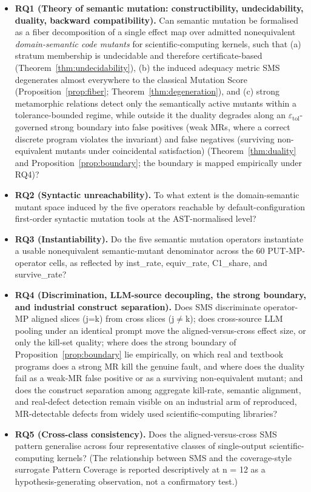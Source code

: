 \documentclass[manuscript,screen,review]{acmart}
\begin{document}
\begin{itemize}

\item
  \textbf{RQ1 (Theory of semantic mutation: constructibility,
  undecidability, duality, backward compatibility).} Can semantic
  mutation be formalised as a fiber decomposition of a single effect map
  over admitted nonequivalent \emph{domain-semantic code mutants} for
  scientific-computing kernels, such that (a) stratum membership is
  undecidable and therefore certificate-based (Theorem~\ref{thm:undecidability}), (b) the
  induced adequacy metric SMS degenerates almost everywhere to the
  classical Mutation Score (Proposition~\ref{prop:fiber}; Theorem~\ref{thm:degeneration}), and (c)
  strong metamorphic relations detect only the semantically active
  mutants within a tolerance-bounded regime, while outside it the duality
  degrades along an $\varepsilon_{\mathrm{tol}}$-governed strong boundary
  into false positives (weak MRs, where a correct discrete program
  violates the invariant) and false negatives (surviving non-equivalent
  mutants under coincidental satisfaction) (Theorem~\ref{thm:duality} and Proposition~\ref{prop:boundary};
  the boundary is mapped empirically under RQ4)?
\item
  \textbf{RQ2 (Syntactic unreachability).} To what extent is the
  domain-semantic mutant space induced by the five operators reachable
  by default-configuration first-order syntactic mutation tools at the
  AST-normalised level?
\item
  \textbf{RQ3 (Instantiability).} Do the five semantic mutation
  operators instantiate a usable nonequivalent semantic-mutant
  denominator across the 60 PUT-MP-operator cells, as reflected by
  inst\_rate, equiv\_rate, C1\_share, and survive\_rate?
\item
  \textbf{RQ4 (Discrimination, LLM-source decoupling, the strong
  boundary, and industrial construct separation).} Does SMS discriminate
  operator-MP aligned slices (j=k) from
  cross slices (j$\neq$k); does cross-source LLM pooling under an
  identical prompt move the aligned-versus-cross effect size, or only the
  kill-set quality; where does the strong boundary of Proposition~\ref{prop:boundary}
  lie empirically, on which real and textbook programs does a strong
  MR kill the genuine fault, and where does the duality fail as a weak-MR
  false positive or as a surviving non-equivalent mutant; and does the
  construct separation among aggregate kill-rate, semantic alignment,
  and real-defect detection remain visible on an industrial arm of
  reproduced, MR-detectable defects from widely used
  scientific-computing libraries?
\item
  \textbf{RQ5 (Cross-class consistency).} Does the aligned-versus-cross
  SMS pattern generalise across four representative classes of
  single-output scientific-computing kernels? (The relationship between
  SMS and the coverage-style surrogate Pattern Coverage is reported
  descriptively at n = 12 as a hypothesis-generating observation, not a
  confirmatory test.)
\end{itemize}
\end{document}
